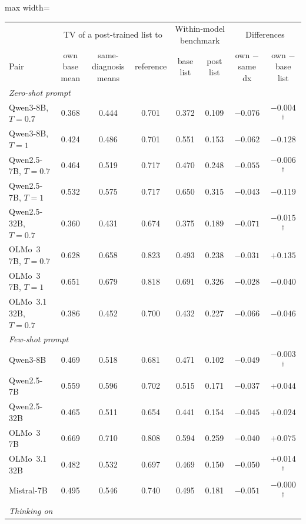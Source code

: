 \documentclass[11pt]{article}
\begin{document}
\begin{table}[t]
\centering\small
\begin{adjustbox}{max width=\linewidth}
\begin{tabular}{lccccccc}
\toprule
 & \multicolumn{3}{c}{TV of a post-trained list to} & \multicolumn{2}{c}{Within-model benchmark} & \multicolumn{2}{c}{Differences} \\
Pair & own base mean & same-diagnosis means & reference & base list & post list & own $-$ same dx & own $-$ base list \\
\midrule
\multicolumn{8}{l}{\emph{Zero-shot prompt}} \\
Qwen3-8B, $T{=}0.7$ & 0.368 & 0.444 & 0.701 & 0.372 & 0.109 & $-0.076$ & $-0.004$$^{\dagger}$ \\
Qwen3-8B, $T{=}1$ & 0.424 & 0.486 & 0.701 & 0.551 & 0.153 & $-0.062$ & $-0.128$ \\
Qwen2.5-7B, $T{=}0.7$ & 0.464 & 0.519 & 0.717 & 0.470 & 0.248 & $-0.055$ & $-0.006$$^{\dagger}$ \\
Qwen2.5-7B, $T{=}1$ & 0.532 & 0.575 & 0.717 & 0.650 & 0.315 & $-0.043$ & $-0.119$ \\
Qwen2.5-32B, $T{=}0.7$ & 0.360 & 0.431 & 0.674 & 0.375 & 0.189 & $-0.071$ & $-0.015$$^{\dagger}$ \\
OLMo~3 7B, $T{=}0.7$ & 0.628 & 0.658 & 0.823 & 0.493 & 0.238 & $-0.031$ & $+0.135$ \\
OLMo~3 7B, $T{=}1$ & 0.651 & 0.679 & 0.818 & 0.691 & 0.326 & $-0.028$ & $-0.040$ \\
OLMo~3.1 32B, $T{=}0.7$ & 0.386 & 0.452 & 0.700 & 0.432 & 0.227 & $-0.066$ & $-0.046$ \\
\midrule
\multicolumn{8}{l}{\emph{Few-shot prompt}} \\
Qwen3-8B & 0.469 & 0.518 & 0.681 & 0.471 & 0.102 & $-0.049$ & $-0.003$$^{\dagger}$ \\
Qwen2.5-7B & 0.559 & 0.596 & 0.702 & 0.515 & 0.171 & $-0.037$ & $+0.044$ \\
Qwen2.5-32B & 0.465 & 0.511 & 0.654 & 0.441 & 0.154 & $-0.045$ & $+0.024$ \\
OLMo~3 7B & 0.669 & 0.710 & 0.808 & 0.594 & 0.259 & $-0.040$ & $+0.075$ \\
OLMo~3.1 32B & 0.482 & 0.532 & 0.697 & 0.469 & 0.150 & $-0.050$ & $+0.014$$^{\dagger}$ \\
Mistral-7B & 0.495 & 0.546 & 0.740 & 0.495 & 0.181 & $-0.051$ & $-0.000$$^{\dagger}$ \\
\midrule
\multicolumn{8}{l}{\emph{Thinking on}} \\

\end{tabular}
\end{adjustbox}
\end{table}
\end{document}
